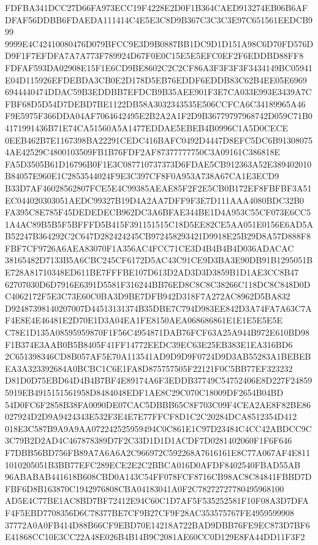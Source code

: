 \documentclass[UTF8,fontset=fandol,zihao=-4,a4paper]{ctexart}
\begin{document}
{{FDFBA341DCC27D66FA973ECC19F4228E2D0F1B364CAED913274EB06B6AFDFAF56DDBB6FDAEDA111414C4E5E3C8D9B367C3C3C3E97C651561EEDCB999
9999E4C42410080476D079BFCC9E3D9B0887BB1DC9D1D151A98C6D70FD576DD9F1F7EFDFA7A7A773F789924D67F0E0C15E5E5EFC0EF2F6EDDBD88FF8
FDFAF593DA02908E15F1E6CD9BE8602C2C2CF86A3F3F3F3F3434149BC05941E04D115926EFDEBDA3CB0E2D178D5EB76EDDF6EDDB83C62B4EE05E6969
6944440474DDAC59B3EDDBB7EFDCB9B35AEE901F3E7CA033E993E3439A7CFBF68D5D54D7DEBD7BE1122DB58A3032343535E506CCFCA6C34189965A46
F9E5975F366DDA04AF7064642495E2B2A2A1F2D9B36779797968742D059C71B04171991436B71E74CA51560A5A1477EDDAE5EBEB4B0996C1A5D0CECE
0EEB462B7E1167398BA22291CEDC416BAFC0492D4447D8EFC5DC6B913080754AE42529C4800103509FB1B76FDF2AF87377777750C3A09161C386818E
FA5D3505B61D16796B0F1E3C087710737373D6FDAE5CB912363A52E389402010B84057E960E1C2853544024F9E3C397CF8F0A953A738A67CA1E3ECD9
B33D7AF46028562807FCE5E4C99385AEAE85F2F2E5CB0B172EF8FBFBF3A51EC044020303051AEDC99327B19D4A2AA7DFF9F3E7D111AAA4080BDC32B0
FA395C8E785F45DEDEDECB962DC3A6BFAE344BE1D4A953C55CF073E6CC51A4AC89B5B5F5BFFFD5B415F391151515C18D5EE82CE5AA051E0156E6AD5A
B52247B364292C2C647D282424245CB972458293421D9918E25B29D8A57D888F8FBF7CF9726A6AEA83070F1A356AC4FCC71CE3D4B4B4B4D036ADACAC
38165482D7133B5A6CBC245CF6172D5AC43C91CE9D3BA3E90DB91B1295051BE728A81710348ED611BE7FFFBE107D613D2AD3D3D3859B1D1AE3CC8B47
62707030D6D7916E6391D5581F316244BB76ED8C8C8C38266C118DC8C848D0DC4062172F5E3C73E60C0BA3D9BE7DFB942D318F7A272AC8962D5BA832
D92487398140207007D44513131374B35DBE7C794D983EE842D3A74FA7A63C7AF4E8E4E46481E2D70E1D3A04EA1FE8150AEA068686861E1E1E5E5E5E
C78E1D135A08595959870F1F56C4954871DAB76FCF63A25A944B972E610BD98F1B374E3AAB0B5B8405F41FF14772EEDC39EC63E25EB383E1EA316BD6
2C651398346CD8B057AF5E70A113541AD9D9D9F0724D9D3AB55283A1BEBEBEA3A323392684A0BCBC1C6E1FA8D875757505F22121F0C5BB77EF323232
D81D0D75EBD64D4B4B7BF4E89174A6F3EDDB37749C54752406E8D227F248595919EB4915151561958D8484048EDF1AE8C29C070C18009DF2654B04BD
54D0FC6F2858B38FA0090DE07CAC5DBBB65C8F703C09F4CEA2AE8F82BE86027924D2D9A9424343E532F3E4E7E77FFCF8D1C2C20284DCA8512354D412
018E3C587B9A9A9AA072242525959494C0C861E1C97D23484C4CC42ABDCC9C3C79B2D2AD4C467878389D7F2C33D1D1D1ACDF7D0281402060F1F6F646
F7DBB56BD756FB89A7A6A6A2C966972C592268A7616161E8C77A067AF4E8111010205051B3BB77EFC289ECE2E2C2BBCA016D0AFDF8402540FBAD55AB
96ABABAB441618B608CBD0A143C54FF078FCF8716CB98AC8C84841FBBD7DFBF6D8B163870C1942976808CBA04183041A0F2C78272727780495968100
AD5E4C77BE1AC8BD7BF72412E94C60C1D7AF5F535252581F10F08A3D7DFAF4F5EBD7708356D6C78377BE7CF9B27CF9F28AC353575767FE4959599908
37772A0A0FB414D88B66CF9EBD70E14218A722BAD9DBB76FE9EC873D7BF6E41868CC10E3CC22A48E026B4B14B9C2081AE60CC0D129E8FA44DD11F3F2
}}
\end{document}
